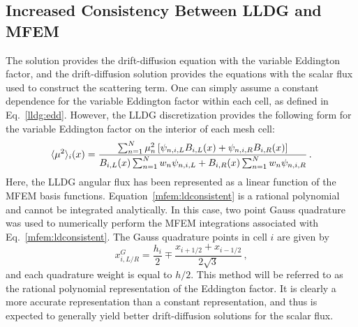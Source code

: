 


\subsection{Increased Consistency Between LLDG and MFEM}
The \SN solution provides the drift-diffusion equation with the variable Eddington factor, and the drift-diffusion solution provides the \SN  
equations with the scalar flux used to construct the scattering term.  One can simply assume a constant dependence for the variable 
Eddington factor within each cell, as defined in Eq.~\ref{lldg:edd}.  However, the LLDG discretization provides the following form for the 
variable Eddington factor on the interior of each mesh cell:
	\begin{equation} \label{mfem:ldconsistent}
		\langle \mu^2 \rangle_i(x) = \frac{
			\sum_{n=1}^N \mu_n^2 \left[\psi_{n,i,L}B_{i,L}(x) + \psi_{n,i,R} B_{i,R}(x)\right]
		}
		{
			B_{i,L}(x) \sum_{n=1}^N w_n \psi_{n,i,L} + B_{i,R}(x) \sum_{n=1}^N w_n \psi_{n,i,R} 
		} \,. 
	\end{equation}
Here, the LLDG angular flux has been represented as a linear function of the MFEM basis functions. Equation~\ref{mfem:ldconsistent} is a rational polynomial and cannot be integrated analytically. In this case, two point Gauss quadrature was used to numerically perform the MFEM integrations associated with  Eq.~\ref{mfem:ldconsistent}.  The Gauss quadrature points in cell $i$ are given by  
	\begin{equation} 
		x^G_{i,L/R} = \frac{h_i}{2} \mp \frac{x_{i+1/2} + x_{i-1/2}}{2\sqrt{3}} \,,
	\end{equation}
and each quadrature weight is equal to $h/2$.  This method will be referred to as the rational polynomial representation of the Eddington factor. It is clearly a more accurate representation than a constant representation, and thus is expected to generally yield better drift-diffusion solutions for the scalar flux.

